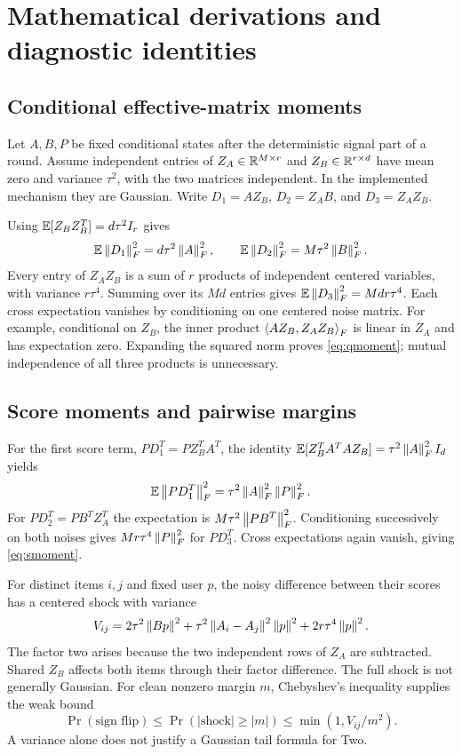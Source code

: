 \section{Mathematical derivations and diagnostic identities}
\label{app:theory}
\subsection{Conditional effective-matrix moments}
Let $A,B,P$ be fixed conditional states after the deterministic signal part
of a round. Assume independent entries of $Z_A\in\mathbb{R}^{M\times r}$ and
$Z_B\in\mathbb{R}^{r\times d}$ have mean zero and variance $\tau^2$, with the
two matrices independent. In the implemented mechanism they are Gaussian.
Write $D_1=AZ_B$, $D_2=Z_AB$, and $D_3=Z_AZ_B$.

Using $\mathbb{E}[Z_BZ_B^T]=d\tau^2I_r$ gives
\begin{equation}
 \mathbb{E}\left\lVert D_1\right\rVert_F^2=d\tau^2\left\lVert A\right\rVert_F^2,
 \qquad \mathbb{E}\left\lVert D_2\right\rVert_F^2=M\tau^2\left\lVert B\right\rVert_F^2.
\end{equation}
Every entry of $Z_AZ_B$ is a sum of $r$ products of independent centered
variables, with variance $r\tau^4$. Summing over its $Md$ entries gives
$\mathbb{E}\left\lVert D_3\right\rVert_F^2=Mdr\tau^4$. Each cross expectation vanishes by
conditioning on one centered noise matrix. For example, conditional on
$Z_B$, the inner product $\left\langle AZ_B,Z_AZ_B\right\rangle_F$ is linear in $Z_A$ and
has expectation zero. Expanding the squared norm proves
\cref{eq:qmoment}; mutual independence of all three products is unnecessary.

\subsection{Score moments and pairwise margins}
For the first score term, $PD_1^T=PZ_B^TA^T$, the identity
$\mathbb{E}[Z_B^TA^TAZ_B]=\tau^2\left\lVert A\right\rVert_F^2I_d$ yields
\begin{equation}
 \mathbb{E}\left\lVert PD_1^T\right\rVert_F^2=\tau^2\left\lVert A\right\rVert_F^2\left\lVert P\right\rVert_F^2.
\end{equation}
For $PD_2^T=PB^TZ_A^T$ the expectation is
$M\tau^2\left\lVert PB^T\right\rVert_F^2$. Conditioning successively on both noises
gives $Mr\tau^4\left\lVert P\right\rVert_F^2$ for $PD_3^T$. Cross expectations again
vanish, giving \cref{eq:smoment}.

For distinct items $i,j$ and fixed user $p$, the noisy difference between
their scores has a centered shock with variance
\begin{equation}
 V_{ij}=2\tau^2\left\lVert Bp\right\rVert^2+
 \tau^2\left\lVert A_i-A_j\right\rVert^2\left\lVert p\right\rVert^2+
 2r\tau^4\left\lVert p\right\rVert^2.
 \label{eq:marginvar}
\end{equation}
The factor two arises because the two independent rows of $Z_A$ are
subtracted. Shared $Z_B$ affects both items through their factor difference.
The full shock is not generally Gaussian. For clean nonzero margin $m$,
Chebyshev's inequality supplies the weak bound
\begin{equation}
 \Pr(\text{sign flip})\leq
 \Pr(|\text{shock}|\geq |m|)\leq \min(1,V_{ij}/m^2).
\end{equation}
A variance alone does not justify a Gaussian tail formula for Two.


